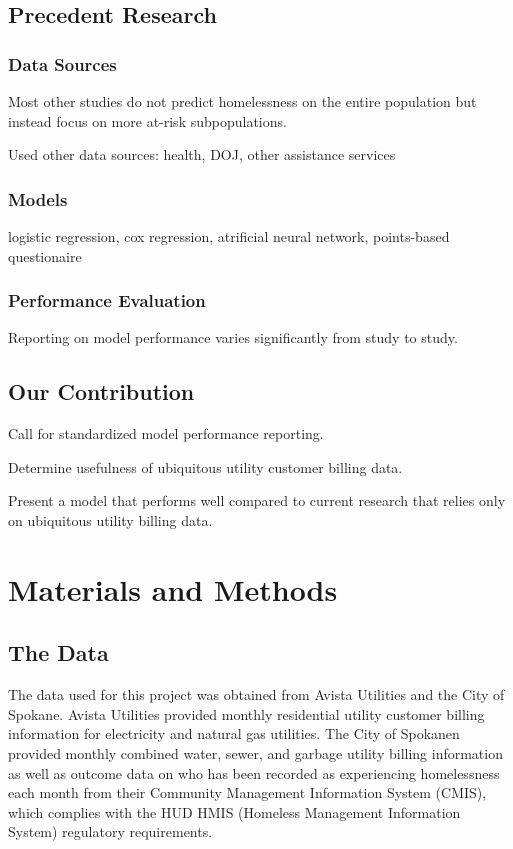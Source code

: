 \documentclass[10pt,letterpaper]{article}
\begin{document}
\subsection*{Precedent Research}
\subsubsection*{Data Sources}
Most other studies do not predict homelessness on the entire population but instead focus on more at-risk subpopulations. 

Used other data sources: health, DOJ, other assistance services

\subsubsection*{Models}
logistic regression, cox regression, atrificial neural network, points-based questionaire

\subsubsection*{Performance Evaluation}
Reporting on model performance varies significantly from study to study.

\subsection*{Our Contribution}
Call for standardized model performance reporting. 

Determine usefulness of ubiquitous utility customer billing data.

Present a model that performs well compared to current research that relies only on ubiquitous utility billing data.


\section*{Materials and Methods}
\subsection*{The Data}
The data used for this project was obtained from Avista Utilities and the City of Spokane. Avista Utilities provided monthly residential utility customer billing information for electricity and natural gas utilities. The City of Spokanen provided monthly combined water, sewer, and garbage utility billing information as well as outcome data on who has been recorded as experiencing homelessness each month from their Community Management Information System (CMIS), which complies with the HUD HMIS (Homeless Management Information System) regulatory requirements.
\end{document}
